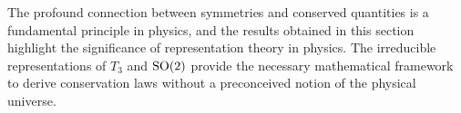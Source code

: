     The profound connection between symmetries and conserved quantities is a fundamental principle in physics, and the results obtained in this section highlight the significance of representation theory in physics. The irreducible representations of $T_3$ and $\textrm{SO}{(2)}$ provide the necessary mathematical framework to derive conservation laws without a preconceived notion of the physical universe.

    
    



